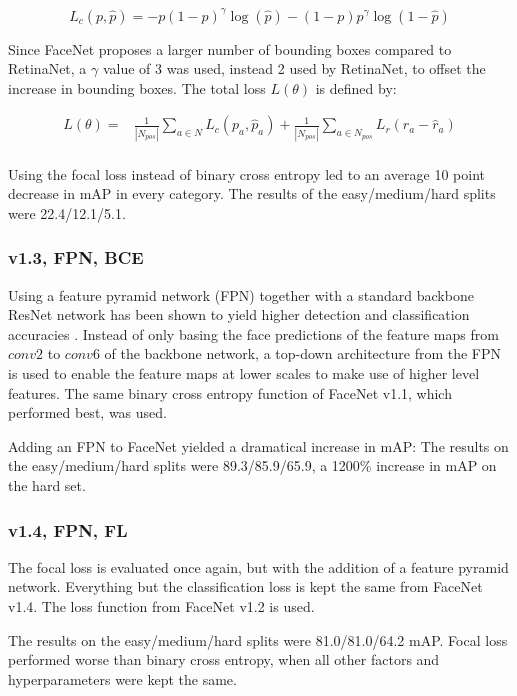 \documentclass[a4paper, twoside]{article}
\begin{document}
\begin{equation}
L_c(p, \hat{p}) = -p (1-p)^\gamma \log{(\hat{p})} -(1-p) p^\gamma\log{(1-\hat{p})}
\end{equation}

Since FaceNet proposes a larger number of bounding boxes compared to RetinaNet, a $\gamma$ value of 3 was used, instead 2 used by RetinaNet, to offset the increase in bounding boxes. The total loss $L(\theta)$ is defined by:

\begin{equation}
\begin{split}
	L(\theta) = &  \frac{1}{|N_{pos}|} \sum_{a \in N} L_c(p_a, \hat{p}_a) 
	 + \frac{1}{|N_{pos}|} \sum_{a \in N_{pos}} L_r(r_a - \hat{r}_a)  \\ 
\end{split}
\end{equation}

Using the focal loss instead of binary cross entropy led to an average 10 point decrease in mAP in every category. The results of the easy/medium/hard splits were 22.4/12.1/5.1.

\subsubsection{v1.3, FPN, BCE}
Using a feature pyramid network (FPN) together with a standard backbone ResNet network has been shown to yield higher detection and classification accuracies \cite{fpn}. Instead of only basing the face predictions of the feature maps from $conv2$ to $conv6$ of the backbone network, a top-down architecture from the FPN is used to enable the feature maps at lower scales to make use of higher level features. The same binary cross entropy function of FaceNet v1.1, which performed best, was used.

Adding an FPN to FaceNet yielded a dramatical increase in mAP: The results on the easy/medium/hard splits were 89.3/85.9/65.9, a 1200\% increase in mAP on the hard set.

\subsubsection{v1.4, FPN, FL}
The focal loss is evaluated once again, but with the addition of a feature pyramid network. Everything but the classification loss is kept the same from FaceNet v1.4. The loss function from FaceNet v1.2 is used.

The results on the easy/medium/hard splits were 81.0/81.0/64.2 mAP. Focal loss performed worse than binary cross entropy, when all other factors and hyperparameters were kept the same.
\end{document}
